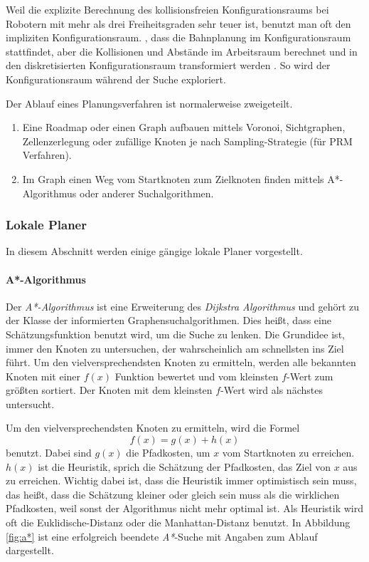 Weil die explizite Berechnung des kollisionsfreien Konfigurationsraums bei Robotern mit mehr als drei Freiheitsgraden sehr teuer ist, benutzt man oft den impliziten Konfigurationsraum.
\Dh, dass die Bahnplanung im Konfigurationsraum stattfindet, aber die Kollisionen und Abstände im Arbeitsraum berechnet und in den diskretisierten Konfigurationsraum transformiert werden \citep{innoKonz}.
So wird der Konfigurationsraum während der Suche exploriert.

Der Ablauf eines Planungsverfahren ist normalerweise zweigeteilt\cite{Russell2003}.
\begin{enumerate}
\item Eine Roadmap oder einen Graph aufbauen mittels \gls{Voronoi},
 \gls{Sichtgraphen}, \gls{Zellenzerlegung} oder zufällige Knoten je nach
 Sampling-Strategie (\zB für \gls{PRM} Verfahren\cite{Thrun2005}).
\item Im Graph einen Weg vom Startknoten zum Zielknoten finden mittels A*-Algorithmus oder anderer Suchalgorithmen.
\end{enumerate}

\subsubsection{Lokale Planer}
\label{bahnplanung_lokale_planer_sec}

In diesem Abschnitt werden einige gängige lokale Planer vorgestellt.

\paragraph{A*-Algorithmus} 

Der \textit{A*-Algorithmus}\citep{Russell2003} ist eine Erweiterung des \textit{Dijkstra Algorithmus} und gehört zu der Klasse der informierten Graphensuchalgorithmen.
Dies heißt, dass eine Schätzungsfunktion benutzt wird, um die Suche zu lenken.
Die Grundidee ist, immer den Knoten zu untersuchen, der wahrscheinlich am schnellsten ins Ziel führt.
Um den vielversprechendsten Knoten zu ermitteln, werden alle bekannten Knoten mit einer $f(x)$ Funktion bewertet und vom kleinsten $f$-Wert zum größten sortiert.
Der Knoten mit dem kleinsten $f$-Wert wird als nächstes untersucht. 

Um den vielversprechendsten Knoten zu ermitteln, wird die Formel
\begin{equation}
 f(x) = g(x) + h(x)
\end{equation}
benutzt.
Dabei sind $g(x)$ die Pfadkosten, um $x$ vom Startknoten zu erreichen.
$h(x)$ ist die Heuristik, sprich die Schätzung der Pfadkosten, das Ziel von $x$ aus zu erreichen.
Wichtig dabei ist, dass die Heuristik immer optimistisch sein muss, das heißt, dass die Schätzung kleiner oder gleich sein muss als die wirklichen Pfadkosten, weil sonst der Algorithmus nicht mehr optimal ist.
Als Heuristik wird oft die \gls{Euklidische-Distanz} oder die \gls{Manhattan-Distanz} benutzt.
In Abbildung \ref{fig:a*} ist eine erfolgreich beendete \textit{A*}-Suche mit Angaben zum Ablauf dargestellt.

